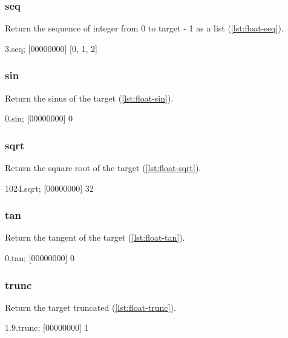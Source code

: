 \subsubsection{seq}

Return the sequence of integer from 0 to target - 1 as a list (\autoref{lst:float-seq}).

\begin{urbiscript}[caption=Float.seq, label=lst:float-seq]
3.seq;
[00000000] [0, 1, 2]
\end{urbiscript}

\subsubsection{sin}

Return the sinus of the target (\autoref{lst:float-sin}).

\begin{urbiscript}[caption=Float.sin, label=lst:float-sin]
0.sin;
[00000000] 0
\end{urbiscript}

\subsubsection{sqrt}

Return the square root of the target (\autoref{lst:float-sqrt}).

\begin{urbiscript}[caption=Float.sqrt, label=lst:float-sqrt]
1024.sqrt;
[00000000] 32
\end{urbiscript}

\subsubsection{tan}

Return the tangent of the target (\autoref{lst:float-tan}).

\begin{urbiscript}[caption=Float.tan, label=lst:float-tan]
0.tan;
[00000000] 0
\end{urbiscript}

\subsubsection{trunc}

Return the target truncated  (\autoref{lst:float-trunc}).

\begin{urbiscript}[caption=Float.trunc, label=lst:float-trunc]
1.9.trunc;
[00000000] 1
\end{urbiscript}

